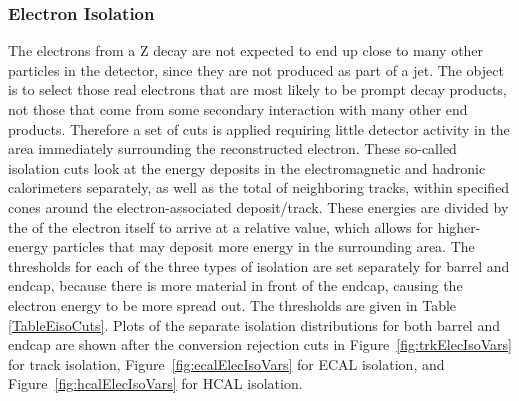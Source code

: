 \subsubsection{Electron Isolation}
\label{evSel:isol}
The electrons from a Z decay are not expected to end up 
close to many other particles in the detector, 
since they are not produced as part of a jet.  
The object is to select those real electrons that are most likely to be prompt decay products,
not those that come from some secondary interaction with many other end products.  
Therefore 
a set of cuts 
is applied 
requiring little detector activity 
in the area immediately surrounding the reconstructed electron.  
These so-called isolation cuts look at the energy deposits 
in the electromagnetic and hadronic calorimeters separately,
as well as the total \pt of neighboring tracks, 
within specified \DR cones around the electron-associated deposit/track.  
These energies are divided by the \pt of the electron itself to arrive at a relative value,
which allows for higher-energy particles that may deposit more energy in the surrounding area.  
The thresholds for each of the three types of isolation are set separately for barrel and endcap, 
because there is more material in front of the endcap, 
causing the electron energy to be more spread out.  
The thresholds are given in Table \ref{TableEisoCuts}.  
Plots of the separate isolation distributions for both barrel and endcap 
are shown after 
the conversion rejection 
cuts in 
Figure~\ref{fig:trkElecIsoVars} for track isolation, 
Figure~\ref{fig:ecalElecIsoVars} for ECAL isolation, and 
Figure~\ref{fig:hcalElecIsoVars} for HCAL isolation.  




